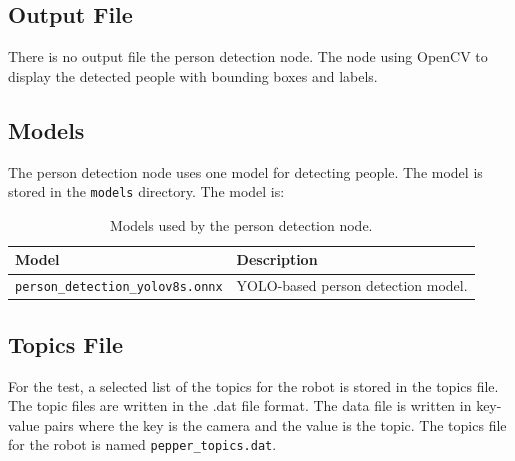 \documentclass{CSSRforAfrica}
\begin{document}
\subsection*{Output File}
There is no output file the person detection node. The node using OpenCV to display the detected people with bounding boxes and labels.

\subsection*{Models}
The person detection node uses one model for detecting people. The model is stored in the \texttt{models} directory. The model is:
\begin{table}[h!]
	\centering
	\begin{tabularx}{\linewidth}{| l | X |}
		\hline
		\rowcolor{blue!20} %
		\textbf{Model} & \textbf{Description} \\
		\hline
		{\footnotesize \texttt{person\_detection\_yolov8s.onnx} }  & {\footnotesize YOLO-based person detection model.} \\
		\hline
	\end{tabularx}
	\caption{Models used by the person detection node.}
\end{table}

\subsection*{Topics File} 
For the test, a selected list of the topics for the robot is stored in the topics file. The topic files are 
written in the .dat file format. The data file is written in key-value pairs where the key is the camera 
and the value is the topic. The topics file for the robot is named \texttt{pepper\_topics.dat}.
\end{document}
